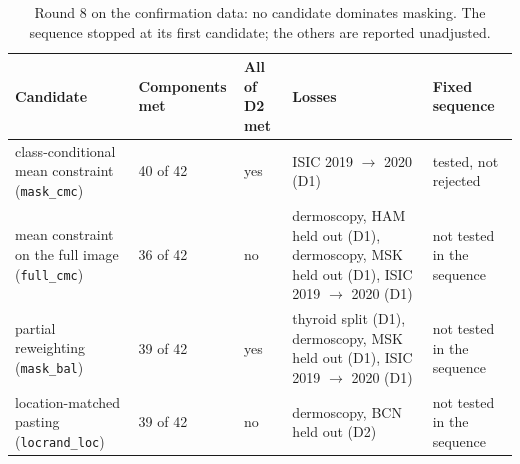 \begin{table}[H]\centering\scriptsize
\caption{Round 8 on the confirmation data: no candidate dominates masking. The sequence stopped at its first candidate; the others are reported unadjusted.}\label{tab:rEight}
\begin{tabular}{p{4.6cm}p{1.6cm}p{1.3cm}p{5.0cm}p{2.6cm}}\toprule
Candidate & Components met & All of D2 met & Losses & Fixed sequence \\\midrule
class-conditional mean constraint (\texttt{mask\_cmc}) & 40 of 42 & yes & ISIC 2019 $\to$ 2020 (D1) & tested, not rejected \\
mean constraint on the full image (\texttt{full\_cmc}) & 36 of 42 & no & dermoscopy, HAM held out (D1), dermoscopy, MSK held out (D1), ISIC 2019 $\to$ 2020 (D1) & not tested in the sequence \\
partial reweighting (\texttt{mask\_bal}) & 39 of 42 & yes & thyroid split (D1), dermoscopy, MSK held out (D1), ISIC 2019 $\to$ 2020 (D1) & not tested in the sequence \\
location-matched pasting (\texttt{locrand\_loc}) & 39 of 42 & no & dermoscopy, BCN held out (D2) & not tested in the sequence \\
\bottomrule\end{tabular}
\end{table}
